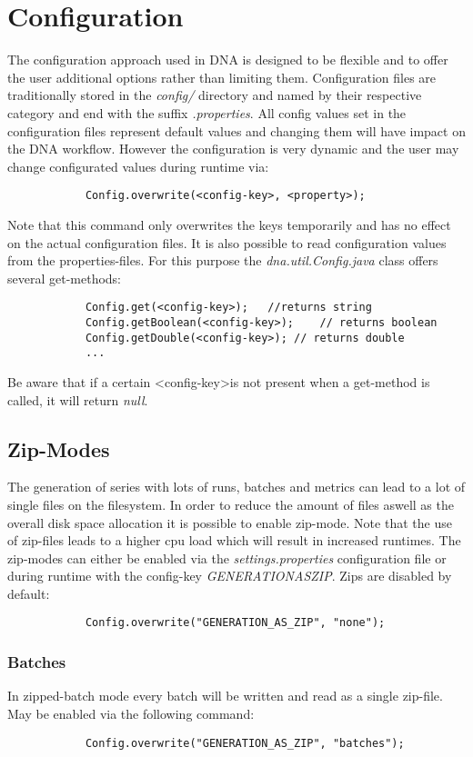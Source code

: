 \chapter{Configuration}
The configuration approach used in DNA is designed to be flexible and to offer the user additional options rather than limiting them. Configuration files are traditionally stored in the \textit{config/} directory and named by their respective category and end with the suffix \textit{.properties}. All config values set in the configuration files represent default values and changing them will have impact on the DNA workflow. However the configuration is very dynamic and the user may change configurated values during runtime via:
\begin{lstlisting}
			Config.overwrite(<config-key>, <property>);
\end{lstlisting}
Note that this command only overwrites the keys temporarily and has no effect on the actual configuration files. It is also possible to read configuration values from the properties-files. For this purpose the \textit{dna.util.Config.java} class offers several get-methods:
\begin{lstlisting}
			Config.get(<config-key>);	//returns string
			Config.getBoolean(<config-key>);	// returns boolean
			Config.getDouble(<config-key>);	// returns double
			...
\end{lstlisting}
Be aware that if a certain \textless config-key\textgreater  is not present when a get-method is called, it will return \textit{null}.

\section{Zip-Modes}
The generation of series with lots of runs, batches and metrics can lead to a lot of single files on the filesystem. In order to reduce the amount of files aswell as the overall disk space allocation it is possible to enable zip-mode. Note that the use of zip-files leads to a higher cpu load which will result in increased runtimes. The zip-modes can either be enabled via the \textit{settings.properties} configuration file or during runtime with the config-key \textit{GENERATION\textunderscore AS\textunderscore ZIP}. Zips are disabled by default:
\begin{lstlisting}
			Config.overwrite("GENERATION_AS_ZIP", "none");
\end{lstlisting}

\subsection{Batches}
In zipped-batch mode every batch will be written and read as a single zip-file. May be enabled via the following command:
\begin{lstlisting}
			Config.overwrite("GENERATION_AS_ZIP", "batches");
\end{lstlisting}

